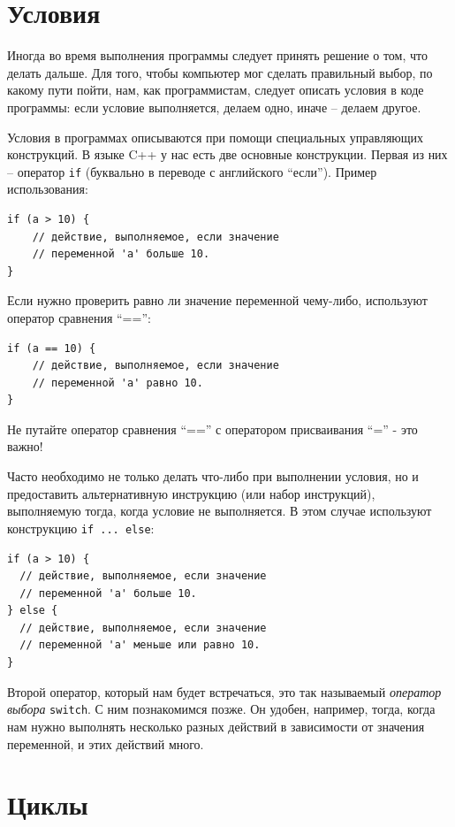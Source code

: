 \documentclass[a4paper,twoside]{book}
\begin{document}
\section{Условия}

Иногда во время выполнения программы следует принять решение о том, что делать
дальше. Для того, чтобы компьютер мог сделать правильный выбор, по какому пути
пойти, нам, как программистам, следует описать условия в коде программы: если
условие выполняется, делаем одно, иначе -- делаем другое.

Условия в программах описываются при помощи специальных управляющих конструкций.
В языке C++ у нас есть две основные конструкции. Первая из них -- оператор
\texttt{if} (буквально в переводе с английского ``если''). Пример использования:

\begin{verbatim}
if (a > 10) {
    // действие, выполняемое, если значение
    // переменной 'a' больше 10.
}
\end{verbatim}

Если нужно проверить равно ли значение переменной чему-либо, используют оператор
сравнения ``=='':

\begin{verbatim}
if (a == 10) {
    // действие, выполняемое, если значение
    // переменной 'a' равно 10.
}
\end{verbatim}

Не путайте оператор сравнения ``=='' с оператором присваивания ``='' - это важно!

Часто необходимо не только делать что-либо при выполнении условия, но и
предоставить альтернативную инструкцию (или набор инструкций), выполняемую
тогда, когда условие не выполняется. В этом случае используют конструкцию
\texttt{if ... else}:

\begin{verbatim}
if (a > 10) {
  // действие, выполняемое, если значение
  // переменной 'a' больше 10.
} else {
  // действие, выполняемое, если значение
  // переменной 'a' меньше или равно 10.
}
\end{verbatim}

Второй оператор, который нам будет встречаться, это так называемый
\emph{оператор выбора} \texttt{switch}. С ним познакомимся позже. Он удобен,
например, тогда, когда нам нужно выполнять несколько разных действий в
зависимости от значения переменной, и этих действий много.

\section{Циклы}
\end{document}
